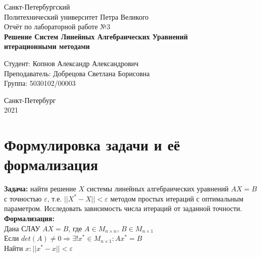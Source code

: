 \documentclass[11pt,a4paper]{article}
\let\epsilon\varepsilon
\renewcommand\;{\hspace{1cm}}
\begin{document}
\begin{titlepage}
  \Large
  \begin{center}
    Санкт-Петербургский\\
    Политехнический университет Петра Великого\\
    \vspace{10em}
    Отчёт по лабораторной работе №3\\
    \vspace{2em}
    \textbf{Решение Систем Линейных Алгебраических Уравнений\\
    итерационными методами}
  \end{center}
  \vspace{6em}
  \begin{flushright}
    Студент: Копнов Александр Александрович\\
    Преподаватель: Добрецова Светлана Борисовна\\
    Группа: 5030102/00003
  \end{flushright}
  \vspace{\fill}
  \begin{center}
    Санкт-Петербург\\
    2021
  \end{center}
\end{titlepage}
\tableofcontents
\pagebreak

\section{Формулировка задачи и её формализация}
\textbf{Задача:} найти решение $X$ системы линейных алгебраических уравнений $AX = B$ с точностью $\epsilon$, т.е. $||X^{*}-X|| < \epsilon$ методом простых итераций с оптимальным параметром. Исследовать зависимость числа итераций от заданной точности.
\textbf{Формализация:}\\
Дана СЛАУ $AX = B$, где $A \in M_{n \times n}$, $B \in M_{n \times 1}$\\
Если $det(A) \neq 0 \Rightarrow \exists! x^{*} \in M_{n\times1} : Ax^{*} = B$\\
Найти $x : ||x^{*}-x|| < \epsilon$
\end{document}
